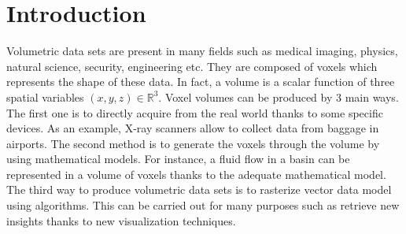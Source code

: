 
\chapter{Introduction} %

\label{Introduction} %


\newcommand{\keyword}[1]{\textbf{#1}}
\newcommand{\tabhead}[1]{\textbf{#1}}
\newcommand{\code}[1]{\texttt{#1}}
\newcommand{\file}[1]{\texttt{\bfseries#1}}
\newcommand{\option}[1]{\texttt{\itshape#1}}



Volumetric data sets are present in many fields such as medical imaging, physics, natural science, security, engineering etc. They are composed of voxels which represents the shape of these data. In fact, a volume is a scalar function of three spatial variables $(x,y,z) \in \mathbb{R}^3$. Voxel volumes can be produced by 3 main ways. The first one is to directly acquire from the real world thanks to some specific devices. As an example, X-ray scanners allow to collect data from baggage in airports. The second method is to generate the voxels through the volume by using mathematical models. For instance, a fluid flow in a basin can be represented in a volume of voxels thanks to the adequate mathematical model. The third way to produce volumetric data sets is to  rasterize vector data model using algorithms. This can be carried out for many purposes such as retrieve new insights thanks to new visualization techniques.